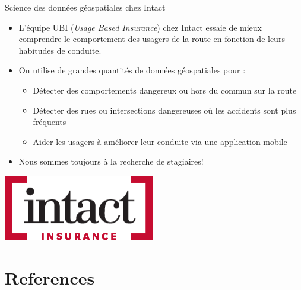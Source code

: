 \documentclass[aspectratio=169]{beamer}
\begin{document}
\begin{frame}{Science des données géospatiales chez Intact}
\begin{itemize}
	\item L'équipe UBI (\textit{Usage Based Insurance}) chez Intact essaie de mieux comprendre le comportement des usagers de la route en fonction de leurs habitudes de conduite.
	\vspace{.5cm}
	\item On utilise de grandes quantités de données géospatiales pour :
	\begin{itemize}
		\item Détecter des comportements dangereux ou hors du commun sur la route
		\item Détecter des rues ou intersections dangereuses où les accidents sont plus fréquents
		\item Aider les usagers à améliorer leur conduite via une application mobile
	\end{itemize}
	\vspace{.5cm}
	\item Nous sommes toujours à la recherche de stagiaires!
\end{itemize}

\centering
\href{https://careers.intact.ca/ca/en/}{\includegraphics[width=.2\textwidth]{figures/intact_logo}}
\end{frame}


\section*{References}

\end{document}
